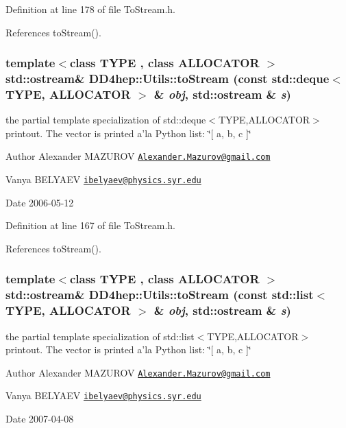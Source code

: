 Definition at line 178 of file ToStream.h.

References toStream().\hypertarget{namespace_d_d4hep_1_1_utils_a679a69b91363e8a4e5c122fd9cb78d5f}{
\subsubsection[{toStream}]{\setlength{\rightskip}{0pt plus 5cm}template$<$class TYPE , class ALLOCATOR $>$ std::ostream\& DD4hep::Utils::toStream (const std::deque$<$ TYPE, ALLOCATOR $>$ \& {\em obj}, \/  std::ostream \& {\em s})}}
\label{namespace_d_d4hep_1_1_utils_a679a69b91363e8a4e5c122fd9cb78d5f}
the partial template specialization of {\ttfamily std::deque$<$TYPE,ALLOCATOR$>$} printout. The vector is printed a'la Python list: \char`\"{}\mbox{[} a, b, c \mbox{]}\char`\"{} \begin{DoxyAuthor}{Author}
Alexander MAZUROV \href{mailto:Alexander.Mazurov@gmail.com}{\tt Alexander.Mazurov@gmail.com} 

Vanya BELYAEV \href{mailto:ibelyaev@physics.syr.edu}{\tt ibelyaev@physics.syr.edu} 
\end{DoxyAuthor}
\begin{DoxyDate}{Date}
2006-\/05-\/12 
\end{DoxyDate}


Definition at line 167 of file ToStream.h.

References toStream().\hypertarget{namespace_d_d4hep_1_1_utils_a5b757be84d0747306749e83ca9168dc7}{
\subsubsection[{toStream}]{\setlength{\rightskip}{0pt plus 5cm}template$<$class TYPE , class ALLOCATOR $>$ std::ostream\& DD4hep::Utils::toStream (const std::list$<$ TYPE, ALLOCATOR $>$ \& {\em obj}, \/  std::ostream \& {\em s})}}
\label{namespace_d_d4hep_1_1_utils_a5b757be84d0747306749e83ca9168dc7}
the partial template specialization of {\ttfamily std::list$<$TYPE,ALLOCATOR$>$} printout. The vector is printed a'la Python list: \char`\"{}\mbox{[} a, b, c \mbox{]}\char`\"{} \begin{DoxyAuthor}{Author}
Alexander MAZUROV \href{mailto:Alexander.Mazurov@gmail.com}{\tt Alexander.Mazurov@gmail.com} 

Vanya BELYAEV \href{mailto:ibelyaev@physics.syr.edu}{\tt ibelyaev@physics.syr.edu} 
\end{DoxyAuthor}
\begin{DoxyDate}{Date}
2007-\/04-\/08 
\end{DoxyDate}



